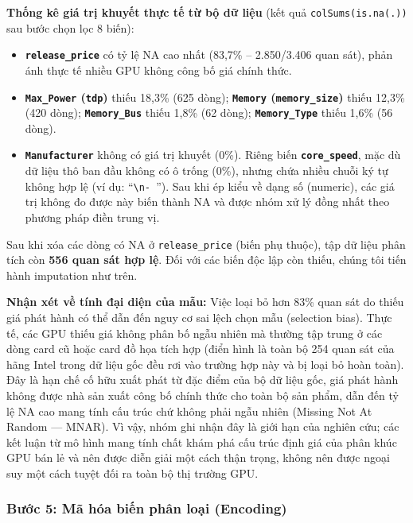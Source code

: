 \documentclass[12pt,a4paper]{article}
\begin{document}
\textbf{Thống kê giá trị khuyết thực tế từ bộ dữ liệu} (kết quả
\texttt{colSums(is.na(.))} sau bước chọn lọc 8 biến):

\begin{itemize}[leftmargin=1.5em]
  \item \textbf{\texttt{release\_price}} có tỷ lệ NA cao nhất (83,7\% -- 2.850/3.406
        quan sát), phản ánh thực tế nhiều GPU không công bố giá chính thức.

  \item \textbf{\texttt{Max\_Power} (\texttt{tdp})} thiếu 18,3\% (625 dòng);
        \textbf{\texttt{Memory} (\texttt{memory\_size})} thiếu 12,3\% (420 dòng);
        \textbf{\texttt{Memory\_Bus}} thiếu 1,8\% (62 dòng); \textbf{\texttt{Memory\_Type}}
        thiếu 1,6\% (56 dòng).

  \item \textbf{\texttt{Manufacturer}} không có giá trị khuyết (0\%). Riêng biến
        \textbf{\texttt{core\_speed}}, mặc dù dữ liệu thô ban đầu không có ô trống (0\%),
        nhưng chứa nhiều chuỗi ký tự không hợp lệ (ví dụ: ``\verb|\n- |''). Sau khi ép
        kiểu về dạng số (numeric), các giá trị không đo được này biến thành NA và được
        nhóm xử lý đồng nhất theo phương pháp điền trung vị.
\end{itemize}

Sau khi xóa các dòng có NA ở \texttt{release\_price} (biến phụ thuộc), tập dữ liệu phân
tích còn \textbf{556 quan sát hợp lệ}. Đối với các biến độc lập còn thiếu, chúng tôi
tiến hành imputation như trên.

\textbf{Nhận xét về tính đại diện của mẫu:} Việc loại bỏ hơn 83\% quan sát do thiếu giá
phát hành có thể dẫn đến nguy cơ sai lệch chọn mẫu (selection bias). Thực tế, các GPU
thiếu giá không phân bố ngẫu nhiên mà thường tập trung ở các dòng card cũ hoặc card đồ
họa tích hợp (điển hình là toàn bộ 254 quan sát của hãng Intel trong dữ liệu gốc đều rơi
vào trường hợp này và bị loại bỏ hoàn toàn). Đây là hạn chế cố hữu xuất phát từ đặc
điểm của bộ dữ liệu gốc, giá phát hành không được nhà sản xuất công bố chính thức cho
toàn bộ sản phẩm, dẫn đến tỷ lệ NA cao mang tính cấu trúc chứ không phải ngẫu nhiên
(Missing Not At Random --- MNAR). Vì vậy, nhóm ghi nhận đây là giới hạn của nghiên cứu;
các kết luận từ mô hình mang tính chất khám phá cấu trúc định giá của phân khúc GPU bán
lẻ và nên được diễn giải một cách thận trọng, không nên được ngoại suy một cách tuyệt đối
ra toàn bộ thị trường GPU.

\subsubsection*{Bước 5: Mã hóa biến phân loại (Encoding)}
\end{document}
